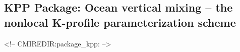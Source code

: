 \subsection{KPP Package: Ocean vertical mixing -- 
the nonlocal K-profile parameterization scheme}

\label{sec:pkg:kpp}
\begin{rawhtml}
<!-- CMIREDIR:package_kpp: -->
\end{rawhtml}
